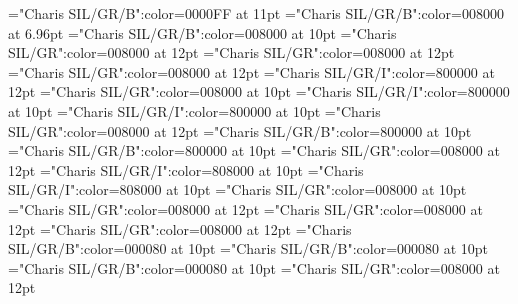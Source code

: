 \documentclass[a4paper,twoside]{article}
\begin{document}
\font\spanmainheadwordentryletDatadicBody="Charis SIL/GR/B":color=0000FF at 11pt
\font\homographnumberentryletDatadicBody="Charis SIL/GR/B":color=008000 at 6.96pt
\font\spanhomographnumberentryletDatadicBody="Charis SIL/GR/B":color=008000 at 10pt
\font\sensesentryletDatadicBody="Charis SIL/GR":color=008000 at 12pt
\font\sharedgrammaticalinfosensesentryletDatadicBody="Charis SIL/GR":color=008000 at 12pt
\font\morphosyntaxanalysissharedgrammaticalinfosensesentryletDatadicBody="Charis SIL/GR":color=008000 at 12pt
\font\partofspeechmorphosyntaxanalysissharedgrammaticalinfosensesentryletDatadicBody="Charis SIL/GR/I":color=800000 at 12pt
\font\spanespartofspeechmorphosyntaxanalysissharedgrammaticalinfosensesentryletDatadicBody="Charis SIL/GR":color=008000 at 10pt
\font\spanspanespartofspeechmorphosyntaxanalysissharedgrammaticalinfosensesentryletDatadicBody="Charis SIL/GR/I":color=800000 at 10pt
\font\spanpartofspeechmorphosyntaxanalysissharedgrammaticalinfosensesentryletDatadicBody="Charis SIL/GR/I":color=800000 at 10pt
\font\sensecontentsensesentryletDatadicBody="Charis SIL/GR":color=008000 at 12pt
\font\sensenumbersensecontentsensesentryletDatadicBody="Charis SIL/GR/B":color=800000 at 10pt
\font\spansensenumbersensecontentsensesentryletDatadicBody="Charis SIL/GR/B":color=800000 at 10pt
\font\sensesensecontentsensesentryletDatadicBody="Charis SIL/GR":color=008000 at 12pt
\font{}="Charis SIL/GR/I":color=808000 at 10pt
\font{}="Charis SIL/GR/I":color=808000 at 10pt
\font{}="Charis SIL/GR":color=008000 at 10pt
\font\examplescontentssensesensecontentsensesentryletDatadicBody="Charis SIL/GR":color=008000 at 12pt
\font\examplescontentexamplescontentssensesensecontentsensesentryletDatadicBody="Charis SIL/GR":color=008000 at 12pt
\font\exampleexamplescontentexamplescontentssensesensecontentsensesentryletDatadicBody="Charis SIL/GR":color=008000 at 12pt
\font\spanmxbexampleexamplescontentexamplescontentssensesensecontentsensesentryletDatadicBody="Charis SIL/GR/B":color=000080 at 10pt
\font\spanspanmxbexampleexamplescontentexamplescontentssensesensecontentsensesentryletDatadicBody="Charis SIL/GR/B":color=000080 at 10pt
\font\spanexampleexamplescontentexamplescontentssensesensecontentsensesentryletDatadicBody="Charis SIL/GR/B":color=000080 at 10pt
\font\translationcontentsexamplescontentexamplescontentssensesensecontentsensesentryletDatadicBody="Charis SIL/GR":color=008000 at 12pt
\end{document}
